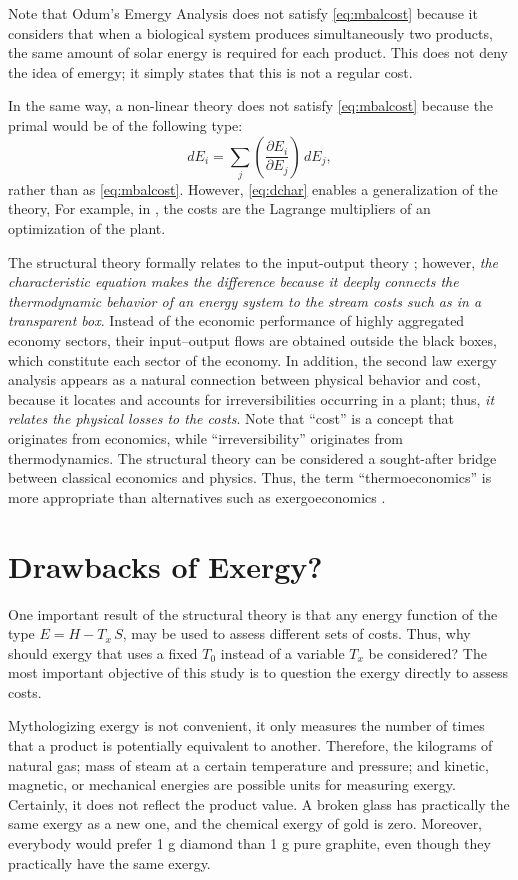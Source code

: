 \documentclass[energies,article,submit,moreauthors,pdftex]{Definitions/mdpi}
\newcommand{\dpartial}[2]{\left(\dfrac{\partial E_{#1}}{\partial E_{#2}}\right)}
\begin{document}
Note that Odum's Emergy Analysis \cite{Odum1988,Brown1996} does not satisfy \eqref{eq:mbalcost} because it considers that when a biological system produces simultaneously two products, the same amount of solar energy is required for each product. This does not deny the idea of emergy; it simply states that this is not a regular cost.

In the same way, a non-linear theory does not satisfy \cref{eq:mbalcost} because the primal would be of the following type:
\begin{equation}
dE_i=\sum_j \dpartial{i}{j}\, dE_j,
\label{eq:dchar}
\end{equation}
rather than as \cref{eq:mbalcost}. However, \cref{eq:dchar} enables a generalization of the theory, For example, in \cite{Brown1996}, the costs are the Lagrange multipliers of an optimization of the plant.

The structural theory formally relates to the input-output theory \cite{Leontief1970}; however, \emph{the characteristic equation makes the difference because it deeply connects the thermodynamic behavior of an energy system to the stream costs such as in a transparent box}. Instead of the economic performance of highly aggregated economy sectors, their input–output flows are obtained outside the black boxes, which constitute each sector of the economy. In addition, the second law exergy analysis appears as a natural connection between physical behavior and cost, because it locates and accounts for irreversibilities occurring in a plant; thus, \emph{it relates the physical losses to the costs}. Note that “cost” is a concept that originates from economics, while “irreversibility” originates from thermodynamics. The structural theory can be considered a sought-after bridge between classical economics and physics. Thus, the term “thermoeconomics” is more appropriate than alternatives such as exergoeconomics \cite{Tsatsaronis2007}. 


\section{Drawbacks of Exergy?}
One important result of the structural theory is that any energy function of the type ${E=H-T_x\,S}$, may be used to assess different sets of costs. Thus, why should exergy that uses a fixed $T_0$ instead of a variable $T_x$ be considered? The most important objective of this study is to question the exergy directly to assess costs. 

Mythologizing exergy is not convenient, it only measures the number of times that a product is potentially equivalent to another. Therefore, the kilograms of natural gas; mass of steam at a certain temperature and pressure; and kinetic, magnetic, or mechanical energies are possible units for measuring exergy. Certainly, it does not reflect the product value. A broken glass has practically the same exergy as a new one, and the chemical exergy of gold is zero. Moreover, everybody would prefer 1 g diamond than 1 g pure graphite, even though they practically have the same exergy.
\end{document}
